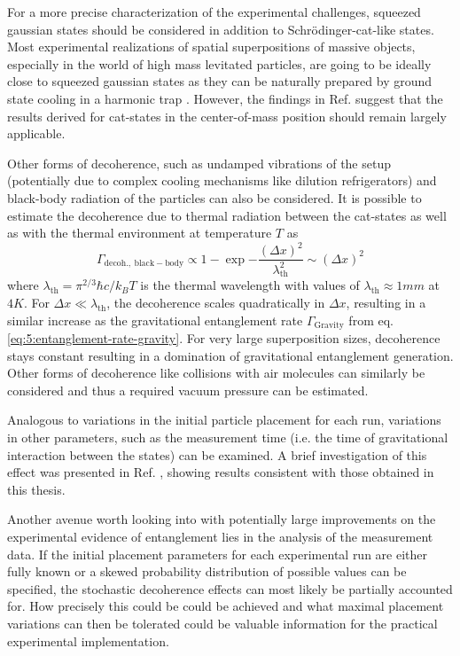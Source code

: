 For a more precise characterization of the experimental challenges, squeezed gaussian states \cite[p. 33-64]{Serafini_2017} should be considered in addition to Schrödinger-cat-like states.
Most experimental realizations of spatial superpositions of massive objects, especially in the world of high mass levitated particles, are going to be ideally close to squeezed gaussian states \cite[Timestamp: 23:00]{Aspelmeyer_2024} as they can be naturally prepared by ground state cooling in a harmonic trap \cite{Weiss_2021}.
However, the findings in Ref. \cite{Pedernales_2023} suggest that the results derived for cat-states in the center-of-mass position should remain largely applicable.

Other forms of decoherence, such as undamped vibrations of the setup (potentially due to complex cooling mechanisms like dilution refrigerators) and black-body radiation of the particles can also be considered.
It is possible to estimate the decoherence due to thermal radiation \cite[p. 127-136]{Schlosshauer_2007} between the cat-states as well as with the thermal environment at temperature $T$ as \cite{RomeroIsart_2011}
\begin{equation}
  \Gamma_\mathrm{decoh.,\ black-body} \propto 1 - \exp{-\frac{(\Delta x)^2}{\lambda^2_\mathrm{th}}} \sim (\Delta x)^2
\end{equation}
where $\lambda_\mathrm{th} = \pi^{2/3} \hbar c / k_B T$ is the thermal wavelength with values of $\lambda_\mathrm{th} \approx 1\si{mm}$ at $4\si{K}$. 
For $\Delta x \ll \lambda_\mathrm{th}$, the decoherence scales quadratically in $\Delta x$, resulting in a similar increase as the gravitational entanglement rate $\Gamma_\mathrm{Gravity}$ from eq. \eqref{eq:5:entanglement-rate-gravity}.
For very large superposition sizes, decoherence stays constant resulting in a domination of gravitational entanglement generation.
Other forms of decoherence like collisions with air molecules can similarly be considered and thus a required vacuum pressure can be estimated.

Analogous to variations in the initial particle placement for each run, variations in other parameters, such as the measurement time (i.e. the time of gravitational interaction between the states) can be examined.
A brief investigation of this effect was presented in Ref. \cite{Nguyen_2020}, showing results consistent with those obtained in this thesis.

Another avenue worth looking into with potentially large improvements on the experimental evidence of entanglement lies in the analysis of the measurement data.
If the initial placement parameters for each experimental run are either fully known or a skewed probability distribution of possible values can be specified, the stochastic decoherence effects can most likely be partially accounted for.
How precisely this could be could be achieved and what maximal placement variations can then be tolerated could be valuable information for the practical experimental implementation.

